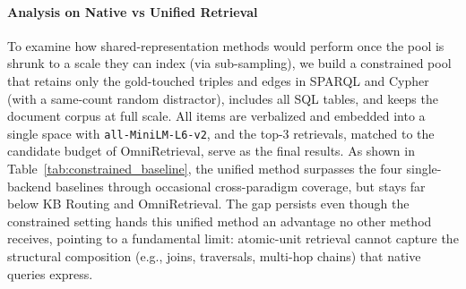 
\paragraph{Analysis on Native vs Unified Retrieval}
To examine how shared-representation methods would perform once the pool is shrunk to a scale they can index (via sub-sampling), we build a constrained pool that retains only the gold-touched triples and edges in SPARQL and Cypher (with a same-count random distractor), includes all SQL tables, and keeps the document corpus at full scale. All items are verbalized and embedded into a single space with \texttt{all-MiniLM-L6-v2}, and the top-3 retrievals, matched to the candidate budget of OmniRetrieval, serve as the final results. As shown in Table~\ref{tab:constrained_baseline}, the unified method surpasses the four single-backend baselines through occasional cross-paradigm coverage, but stays far below KB Routing and OmniRetrieval. The gap persists even though the constrained setting hands this unified method an advantage no other method receives, pointing to a fundamental limit: atomic-unit retrieval cannot capture the structural composition (e.g., joins, traversals, multi-hop chains) that native queries express.
